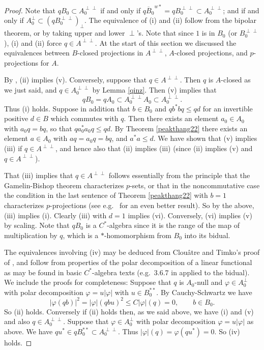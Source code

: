 \documentclass{amsart}
\theoremstyle{remark}
\theoremstyle{definition}
\numberwithin{equation}{section}
\begin{document}
\begin{proof}   Note that  $q B_0 \subset A_0^{\perp \perp}$ if and only if $\overline{q B_0}^{w*} = q B_0^{\perp \perp} \subset A_0^{\perp \perp}$;
and  if and only if  $A_0^{\perp} \subset (q B_0^{\perp \perp})_\perp$. 
The equivalence of (i) and (ii) follow from the bipolar theorem, or by taking upper and lower $\perp$'s.
Note that since $1$ is in $B_0$ (or $B_0^{\perp \perp}$), (i) and (ii) force $q \in A^{\perp \perp}$.   At the start of this section we discussed the equivalences between $B$-closed 
projections in $A^{\perp \perp}$, $A$-closed projections, and  $p$-projections for $A$.  

By \cite[Proposition 3.4]{Hay}, (ii) implies (v).
Conversely, suppose that $q \in A^{\perp \perp}$.  Then $q$ is
$A$-closed as we just said, and $q \in A_0^{\perp \perp}$ 
by Lemma \ref{qinz}.
Then (v) implies that $$q B_0 = q A_0 \subset A_0^{\perp \perp} A_0 \subset
A_0^{\perp \perp} .$$  Thus (i) holds.  Suppose in addition that $b \in B_0$ 
 and $q b^* b q  \leq q d$ for an invertible positive $d \in B$ which commutes with $q$.  Then there exists an element $a_0 \in A_0$ with $a_0 q = b q$, so that
 $q a_0^* a_0 q  \leq q d$.   
 By Theorem  \ref{peakthang22} there exists an element $a \in A_0$ with $a q = a_0 q = b q$, and $a^* a \leq d$.   
We have shown that (v) implies (iii) if $q \in A^{\perp \perp}$, and hence also that (ii) implies (iii) (since  (ii) implies (v) and $q \in A^{\perp \perp}$).   

That (iii) implies that  $q \in A^{\perp \perp}$ follows essentially from the principle that the Gamelin-Bishop theorem characterizes 
$p$-sets, or that  in the noncommutative case  the condition in the last sentence of Theorem  \ref{peakthang22} with $b = 1$ characterizes $p$-projections (see e.g.\ \cite[Theorem 5.10]{Hay}
for an even better result).    So by the above, (iii) implies (i). 
Clearly (iii) with $d = 1$ implies (vi). Conversely,  (vi) implies (v) by scaling.   Note that $q B_0$ is a $C^*$-algebra since it is the range of the map of multiplication by $q$, which is a 
$*$-homomorphism from $B_0$ into its bidual.  
 
 
The equivalences involving (iv) may be deduced from Clou\^atre and Timko's proof of \cite[Theorem 6.2]{CT}, and follow from properties of the polar decomposition 
 of a linear functional as may be found in basic $C^*$-algebra 
texts (e.g.\ 3.6.7 in \cite{Ped} applied to the bidual).
  We include the proofs for completeness:
Suppose that $q$ is $A_0$-null  and $\varphi \in A_0^{\perp}$ with polar decomposition $\varphi  = u |\varphi |$ with $u \in B_0^{**}$.  
By Cauchy-Schwartz we have 
$$|\varphi(q b) |^2  =  |\varphi |(q b u ) ^2   \leq C |\varphi|(q) = 0 , \qquad b \in B_0 .$$
So (ii) holds.
Conversely if (ii) holds then, as we said above, we have (i) and (v) and also $q \in A_0^{\perp \perp}$.  
Suppose that $\varphi \in A_0^{\perp}$  with polar decomposition $\varphi  = u |\varphi |$  as above.  We have $q u^* \in q B_0^{**} 
 \subset A_0^{\perp \perp}.$
Thus  $|\varphi |(q) = \varphi(q u^*) = 0$.   So (iv) holds.  
  \end{proof}
\end{document}

